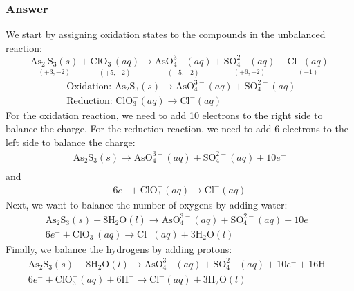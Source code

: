 \documentclass[12pt]{article}
\begin{document}
\subsubsection{Answer}
We start by assigning oxidation states to the compounds in the unbalanced reaction:
\begin{equation}
  \underset{(+3, -2)}{\mathrm{As}_{2} \mathrm{~S}_{3}(s)} + \underset{(+5, -2)}{\mathrm{ClO}_{3}^{-}(a q)} \rightarrow \underset{(+5, -2)}{\mathrm{AsO}_{4}^{3-}(a q)} + \underset{(+6, -2)}{\mathrm{SO}_{4}^{2-}(a q)} + \underset{(-1)}{\mathrm{Cl}^{-}(a q)}
\end{equation}
\begin{equation}
\begin{array}{l}
\text { Oxidation: } \mathrm{As}_{2} \mathrm{S}_{3}(s) \rightarrow \mathrm{AsO}_{4}^{3-}(a q) + \mathrm{SO}_{4}^{2-}(a q) \\
\text { Reduction: } \mathrm{ClO}_{3}^{-}(a q) \rightarrow \mathrm{Cl}^{-}(a q)
\end{array}
\end{equation}
For the oxidation reaction, we need to add 10 electrons to the right side to balance the charge. For the reduction reaction, we need to add 6 electrons to the left side to balance the charge:
\begin{equation}
\begin{array}{l}
\mathrm{As}_{2} \mathrm{S}_{3}(s) \rightarrow \mathrm{AsO}_{4}^{3-}(a q) + \mathrm{SO}_{4}^{2-}(a q) + 10 e^{-} \\
\end{array}
\end{equation}
and
\begin{equation}
\begin{array}{l}
6 e^{-} + \mathrm{ClO}_{3}^{-}(a q) \rightarrow \mathrm{Cl}^{-}(a q)
\end{array}
\end{equation}
Next, we want to balance the number of oxygens by adding water:
\begin{equation}
\begin{array}{l}
\mathrm{As}_{2} \mathrm{S}_{3}(s) + 8 \mathrm{H}_{2} \mathrm{O}(l) \rightarrow \mathrm{AsO}_{4}^{3-}(a q) + \mathrm{SO}_{4}^{2-}(a q) + 10 e^{-}\\
6 e^{-} + \mathrm{ClO}_{3}^{-}(a q) \rightarrow \mathrm{Cl}^{-}(a q) + 3 \mathrm{H}_{2} \mathrm{O}(l)
\end{array}
\end{equation}
Finally, we balance the hydrogens by adding protons:
\begin{equation}
\begin{array}{l}
\mathrm{As}_{2} \mathrm{S}_{3}(s) + 8 \mathrm{H}_{2} \mathrm{O}(l) \rightarrow \mathrm{AsO}_{4}^{3-}(a q) + \mathrm{SO}_{4}^{2-}(a q) + 10 e^{-} + 16 \mathrm{H}^{+}\\
6 e^{-} + \mathrm{ClO}_{3}^{-}(a q) + 6 \mathrm{H}^{+} \rightarrow \mathrm{Cl}^{-}(a q) + 3 \mathrm{H}_{2} \mathrm{O}(l)
\end{array}
\end{equation}
\end{document}

